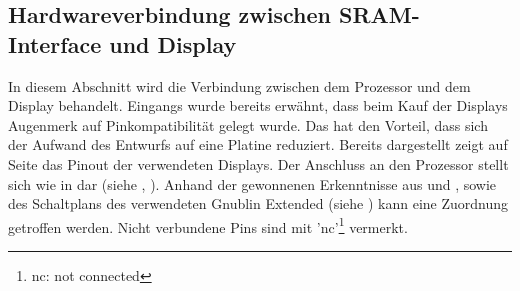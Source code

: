 \newpage
\subsection{Hardwareverbindung zwischen SRAM-Interface und Display}
In diesem Abschnitt wird die Verbindung zwischen dem Prozessor und dem Display behandelt. Eingangs wurde bereits erwähnt, dass beim Kauf der Displays Augenmerk auf Pinkompatibilität gelegt wurde. Das hat den Vorteil, dass sich der Aufwand des Entwurfs auf eine Platine reduziert. \newline
Bereits dargestellt zeigt  auf Seite \pageref{fig:8080_pinout} das Pinout der verwendeten Displays. Der Anschluss an den Prozessor stellt sich wie in  dar (siehe \cite{Coldtears2014}, \cite{EmbeddedProjects2013}). Anhand der gewonnenen Erkenntnisse aus  und , sowie des Schaltplans des verwendeten Gnublin Extended (siehe \cite{EmbeddedProjects2013}) kann eine Zuordnung getroffen werden. Nicht verbundene Pins sind mit 'nc'\footnote{nc: not connected} vermerkt.

